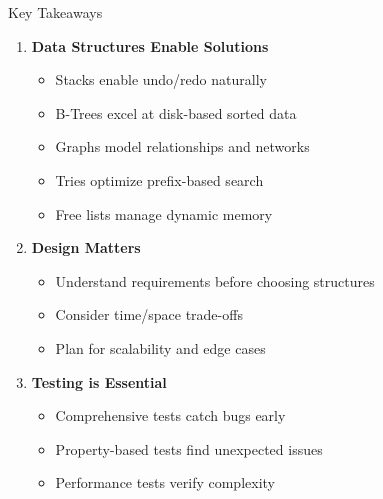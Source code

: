 \documentclass[aspectratio=169,xcolor=dvipsnames]{beamer}
\begin{document}
\begin{frame}{Key Takeaways}
  \begin{enumerate}
    \item \textbf{Data Structures Enable Solutions}
    \begin{itemize}
      \item Stacks enable undo/redo naturally
      \item B-Trees excel at disk-based sorted data
      \item Graphs model relationships and networks
      \item Tries optimize prefix-based search
      \item Free lists manage dynamic memory
    \end{itemize}

    \vspace{0.2cm}
    \item \textbf{Design Matters}
    \begin{itemize}
      \item Understand requirements before choosing structures
      \item Consider time/space trade-offs
      \item Plan for scalability and edge cases
    \end{itemize}

    \vspace{0.2cm}
    \item \textbf{Testing is Essential}
    \begin{itemize}
      \item Comprehensive tests catch bugs early
      \item Property-based tests find unexpected issues
      \item Performance tests verify complexity
    \end{itemize}
  \end{enumerate}
\end{frame}
\end{document}
